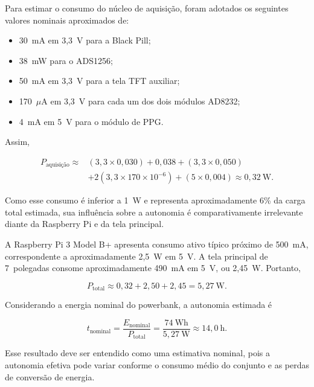 \documentclass[a4paper,12pt]{fcte}
\begin{document}
Para estimar o consumo do núcleo de aquisição, foram adotados os seguintes valores nominais aproximados de:

\begin{itemize}
    \item 30~mA em 3,3~V para a Black Pill;
    \item 38~mW para o ADS1256;
    \item 50~mA em 3,3~V para a tela TFT auxiliar;
    \item 170~$\mu$A em 3,3~V para cada um dos dois módulos AD8232;
    \item 4~mA em 5~V para o módulo de PPG.
\end{itemize}

Assim,

\begin{equation}
\begin{split}
P_{\text{aquisição}} \approx {}&
(3{,}3 \times 0{,}030)
+ 0{,}038
+ (3{,}3 \times 0{,}050)\\
&+2(3{,}3 \times 170\times10^{-6})
+(5 \times 0{,}004)
\approx 0{,}32~\mathrm{W}.
\end{split}
\end{equation}

Como esse consumo é inferior a 1~W e representa aproximadamente 6\% da carga total estimada, sua influência sobre a autonomia é comparativamente irrelevante diante da Raspberry Pi e da tela principal.

A Raspberry Pi 3 Model B+ apresenta consumo ativo típico próximo de 500~mA, correspondente a aproximadamente 2,5~W em 5~V. A tela principal de 7~polegadas consome aproximadamente 490~mA em 5~V, ou 2,45~W. Portanto,

\begin{equation}
P_{\mathrm{total}}
\approx
0{,}32 + 2{,}50 + 2{,}45
=
5{,}27~\mathrm{W}.
\end{equation}

Considerando a energia nominal do powerbank, a autonomia estimada é

\begin{equation}
t_{\mathrm{nominal}}
=
\frac{E_{\mathrm{nominal}}}{P_{\mathrm{total}}}
=
\frac{74~\mathrm{Wh}}{5{,}27~\mathrm{W}}
\approx
14{,}0~\mathrm{h}.
\end{equation}

Esse resultado deve ser entendido como uma estimativa nominal, pois a autonomia efetiva pode variar conforme o consumo médio do conjunto e as perdas de conversão de energia.
\end{document}
